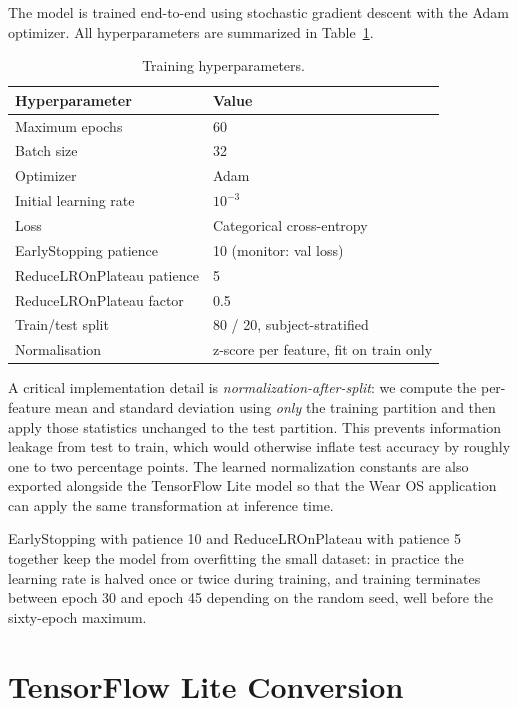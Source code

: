 The model is trained end-to-end using stochastic gradient descent
with the Adam optimizer. All hyperparameters are summarized in
Table~\ref{tab:hparams}.

\begin{table}[H]
\centering
\caption{Training hyperparameters.}
\label{tab:hparams}
\small
\begin{tabular}{ll}
\toprule
\textbf{Hyperparameter} & \textbf{Value} \\
\midrule
Maximum epochs       & 60 \\
Batch size           & 32 \\
Optimizer            & Adam \\
Initial learning rate & $10^{-3}$ \\
Loss                 & Categorical cross-entropy \\
EarlyStopping patience & 10 (monitor: val loss) \\
ReduceLROnPlateau patience & 5 \\
ReduceLROnPlateau factor & 0.5 \\
Train/test split     & 80 / 20, subject-stratified \\
Normalisation        & z-score per feature, fit on train only \\
\bottomrule
\end{tabular}
\end{table}

A critical implementation detail is \emph{normalization-after-split}:
we compute the per-feature mean and standard deviation using
\emph{only} the training partition and then apply those statistics
unchanged to the test partition. This prevents information leakage
from test to train, which would otherwise inflate test accuracy
by roughly one to two percentage points. The learned normalization
constants are also exported alongside the TensorFlow Lite model so
that the Wear OS application can apply the same transformation
at inference time.

EarlyStopping with patience 10 and ReduceLROnPlateau with patience 5
together keep the model from overfitting the small dataset: in
practice the learning rate is halved once or twice during training,
and training terminates between epoch 30 and epoch 45 depending on
the random seed, well before the sixty-epoch maximum.

\section{TensorFlow Lite Conversion}
\label{sec:m-tflite}

